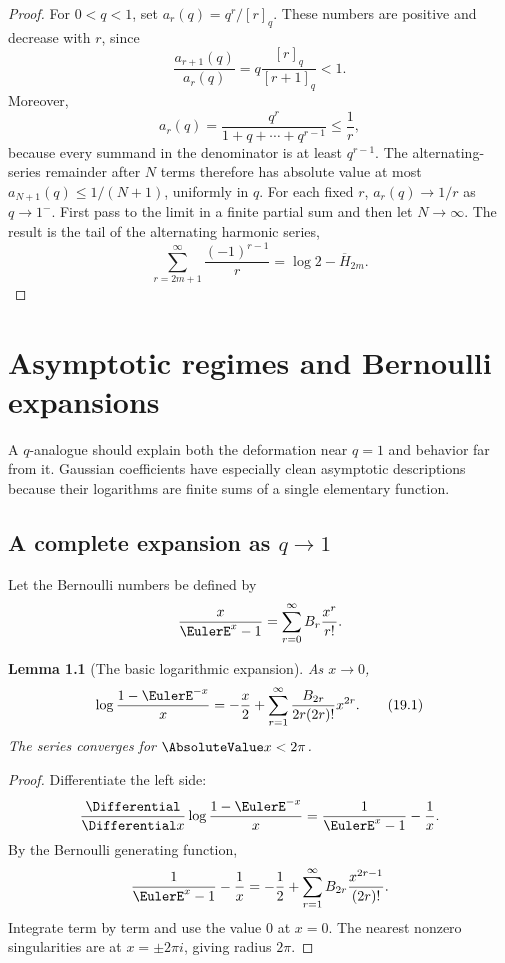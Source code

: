 \documentclass[11pt,a4paper,oneside,openany]{book}
\newtheorem{lemma}[lemma]{Lemma}
\theoremstyle{definition}
\theoremstyle{remark}
\begin{document}
\begin{proof}
For $0<q<1$, set $a_r(q)=q^r/[r]_q$.  These numbers are positive and decrease with $r$, since
\[
 \frac{a_{r+1}(q)}{a_r(q)}=q\frac{[r]_q}{[r+1]_q}<1.
\]
Moreover,
\[
 a_r(q)=\frac{q^r}{1+q+\cdots+q^{r-1}}
 \le\frac1r,
\]
because every summand in the denominator is at least $q^{r-1}$.  The alternating-series remainder after $N$ terms therefore has absolute value at most $a_{N+1}(q)\le1/(N+1)$, uniformly in $q$.  For each fixed $r$, $a_r(q)\to1/r$ as $q\to1^-$.  First pass to the limit in a finite partial sum and then let $N\to\infty$.  The result is the tail of the alternating harmonic series,
\[
 \sum_{r=2m+1}^{\infty}\frac{(-1)^{r-1}}r
 =\log2-\overline H_{2m}.
\]
\end{proof}

\chapter{Asymptotic regimes and Bernoulli expansions}\label{chap:asymptotics}

A $q$-analogue should explain both the deformation near $q=1$ and behavior far from it.  Gaussian coefficients have especially clean asymptotic descriptions because their logarithms are finite sums of a single elementary function.

\section{A complete expansion as \texorpdfstring{$q\to1$}{q to 1}}

Let the Bernoulli numbers be defined by
\[
 \frac{x}{\EulerE^x-1}=\sum_{r=0}^{\infty}B_r\frac{x^r}{r!}.
\]

\begin{lemma}[The basic logarithmic expansion]\label{lem:basic-bernoulli-log}
As $x\to0$,
\[
 \log\frac{1-\EulerE^{-x}}x
 =-\frac x2+
 \sum_{r=1}^{\infty}
 \frac{B_{2r}}{2r(2r)!}x^{2r}.
 \tag{19.1}\label{eq:basic-bernoulli-log}
\]
The series converges for $\AbsoluteValue x<2\pi$.
\end{lemma}

\begin{proof}
Differentiate the left side:
\[
 \frac{\Differential}{\Differential x}\log\frac{1-\EulerE^{-x}}x
 =\frac1{\EulerE^x-1}-\frac1x.
\]
By the Bernoulli generating function,
\[
 \frac1{\EulerE^x-1}-\frac1x
 =-\frac12+\sum_{r=1}^{\infty}
 B_{2r}\frac{x^{2r-1}}{(2r)!}.
\]
Integrate term by term and use the value $0$ at $x=0$.  The nearest nonzero singularities are at $x=\pm2\pi i$, giving radius $2\pi$.
\end{proof}
\end{document}
